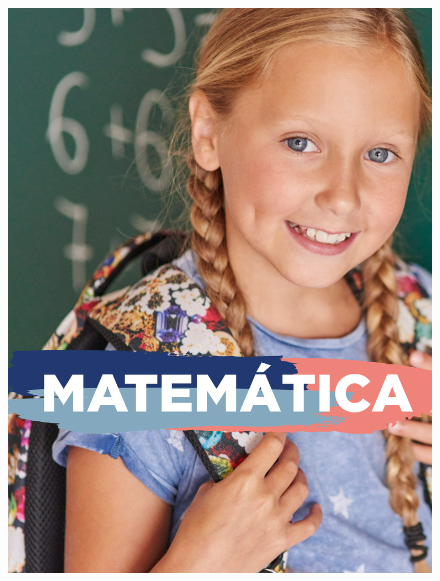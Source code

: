 \begin{figure}[htpb]
\vspace*{-2.5cm}
\hspace*{-2.5cm}\includegraphics[height=\paperheight]{../separadores/separadorMAT5A.png}
\end{figure}
\pagebreak
